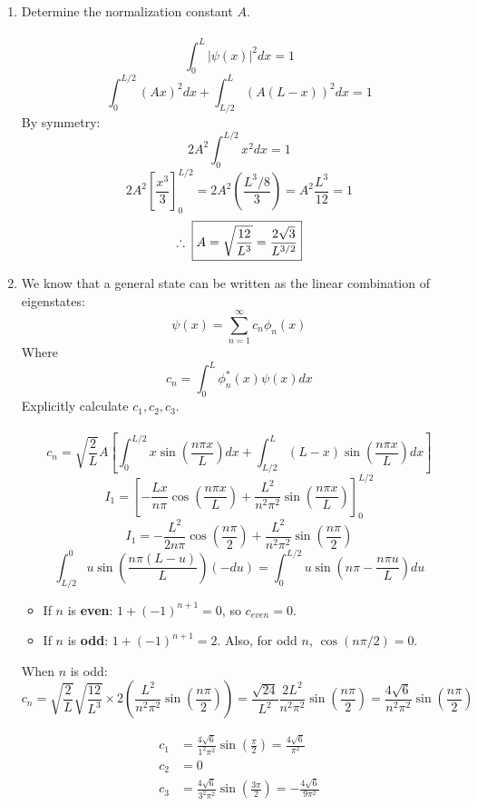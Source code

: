 \documentclass{article}
\begin{document}
\begin{enumerate}[label=\alph*.]
    \item Determine the normalization constant $A$.
    \\
    \\
    \[ \int_0^L |\psi(x)|^2 dx = 1 \]
    \[ \int_0^{L/2} (Ax)^2 dx + \int_{L/2}^L (A(L-x))^2 dx = 1 \]
    By symmetry:
    \[ 2 A^2 \int_0^{L/2} x^2 dx = 1 \]
    \[ 2 A^2 \left[ \frac{x^3}{3} \right]_0^{L/2} = 2 A^2 \left( \frac{L^3/8}{3} \right) = A^2 \frac{L^3}{12} = 1 \]
    \[\therefore \hspace{1mm} \boxed{A = \sqrt{\frac{12}{L^3}} = \frac{2\sqrt{3}}{L^{3/2}}} \]

    \item We know that a general state can be written as the linear combination of eigenstates:
    \[ \psi(x) = \sum_{n=1}^\infty c_n\phi_n(x) \]
    Where
    \[ c_n = \int_0^L \phi_n^*(x)\psi(x)dx \]
    Explicitly calculate $c_1, c_2, c_3$.
    \\
    \\
    \[ c_n = \sqrt{\frac{2}{L}} A \left[ \int_0^{L/2} x \sin\left(\frac{n\pi x}{L}\right) dx + \int_{L/2}^L (L-x) \sin\left(\frac{n\pi x}{L}\right) dx \right] \]
    \[ I_1 = \left[ -\frac{Lx}{n\pi} \cos\left(\frac{n\pi x}{L}\right) + \frac{L^2}{n^2\pi^2} \sin\left(\frac{n\pi x}{L}\right) \right]_0^{L/2} \]
    \[ I_1 = -\frac{L^2}{2n\pi} \cos\left(\frac{n\pi}{2}\right) + \frac{L^2}{n^2\pi^2} \sin\left(\frac{n\pi}{2}\right) \]
    \[ \int_{L/2}^0 u \sin\left(\frac{n\pi(L-u)}{L}\right) (-du) = \int_0^{L/2} u \sin\left(n\pi - \frac{n\pi u}{L}\right) du \]
    \begin{itemize}
        \item If $n$ is \textbf{even}: $1 + (-1)^{n+1} = 0$, so $c_{even} = 0$.
        \item If $n$ is \textbf{odd}: $1 + (-1)^{n+1} = 2$. Also, for odd $n$, $\cos(n\pi/2) = 0$.
    \end{itemize}
    When $n$ is odd:
    \[ c_n = \sqrt{\frac{2}{L}} \sqrt{\frac{12}{L^3}} \times 2 \left( \frac{L^2}{n^2\pi^2} \sin\left(\frac{n\pi}{2}\right) \right) = \frac{\sqrt{24}}{L^2} \frac{2L^2}{n^2\pi^2} \sin\left(\frac{n\pi}{2}\right) = \frac{4\sqrt{6}}{n^2\pi^2} \sin\left(\frac{n\pi}{2}\right) \]
    
    \begin{align*}
        c_1 &= \frac{4\sqrt{6}}{1^2\pi^2} \sin\left(\frac{\pi}{2}\right) = \frac{4\sqrt{6}}{\pi^2} \\
        c_2 &= 0 \\
        c_3 &= \frac{4\sqrt{6}}{3^2\pi^2} \sin\left(\frac{3\pi}{2}\right) = -\frac{4\sqrt{6}}{9\pi^2}
    \end{align*}


\end{enumerate}
\end{document}
